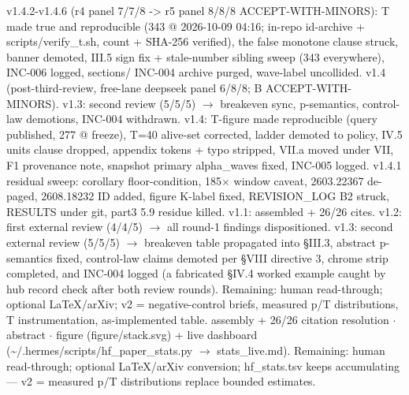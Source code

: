 \documentclass[
]{article}
\begin{document}
v1.4.2-v1.4.6 (r4 panel 7/7/8 -\textgreater{} r5 panel 8/8/8
ACCEPT-WITH-MINORS): T made true and reproducible (343 @ 2026-10-09
04:16; in-repo id-archive + scripts/verify\_t.sh, count + SHA-256
verified), the false monotone clause struck, banner demoted, III.5 sign
fix + stale-number sibling sweep (343 everywhere), INC-006 logged,
sections/ INC-004 archive purged, wave-label uncollided. v1.4
(post-third-review, free-lane deepseek panel 6/8/8; B
ACCEPT-WITH-MINORS). v1.3: second review (5/5/5) $\rightarrow$ breakeven sync,
p-semantics, control-law demotions, INC-004 withdrawn. v1.4: T-figure
made reproducible (query published, 277 @ freeze), T=40 alive-set
corrected, ladder demoted to policy, IV.5 units clause dropped, appendix
tokens + typo stripped, VII.a moved under VII, F1 provenance note,
snapshot primary alpha\_waves fixed, INC-005 logged. v1.4.1 residual
sweep: corollary floor-condition, 185$\times$ window caveat, 2603.22367
de-paged, 2608.18232 ID added, figure K-label fixed, REVISION\_LOG B2
struck, RESULTS under git, part3 5.9 residue killed. v1.1: assembled +
26/26 cites. v1.2: first external review (4/4/5) $\rightarrow$ all round-1 findings
dispositioned. v1.3: second external review (5/5/5) $\rightarrow$ breakeven table
propagated into \S{}III.3, abstract p-semantics fixed, control-law claims
demoted per \S{}VIII directive 3, chrome strip completed, and INC-004
logged (a fabricated \S{}IV.4 worked example caught by hub record check
after both review rounds). Remaining: human read-through; optional
LaTeX/arXiv; v2 = negative-control briefs, measured p/T distributions, T
instrumentation, as-implemented table. assembly + 26/26 citation
resolution $\cdot$ abstract $\cdot$ figure (figure/stack.svg) + live dashboard
(\textasciitilde/.hermes/scripts/hf\_paper\_stats.py $\rightarrow$ stats\_live.md).
Remaining: human read-through; optional LaTeX/arXiv conversion;
hf\_stats.tsv keeps accumulating --- v2 = measured p/T distributions
replace bounded estimates.
\end{document}
